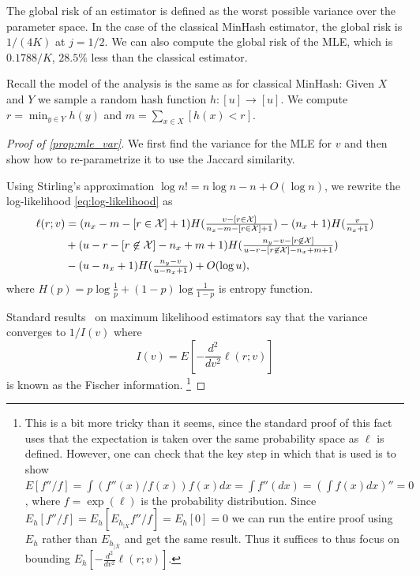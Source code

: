 The global risk of an estimator is defined as the worst possible variance over the parameter space.
In the case of the classical MinHash estimator, the global risk is $1/(4K)$ at $j=1/2$.
We can also compute the global risk of the MLE, which is $0.1788/K$, $28.5\%$ less than the classical estimator.

\smallskip

Recall the model of the analysis is the same as for classical MinHash:
Given $X$ and $Y$ we sample a random hash function $h:[u]\to[u]$.
We compute $r=\min_{y\in Y}h(y)$ and $m=\sum_{x\in X}[h(x)<r]$.

\begin{proof}[Proof of \cref{prop:mle_var}]
   We first find the variance for the MLE for $v$ and then show how to re-parametrize it to use the Jaccard similarity.

   Using Stirling's approximation $ \log n! = n\log n - n + O(\log n)$,
   we rewrite the log-likelihood \cref{eq:log-likelihood} as
   \begin{align}
      \ell(r;v) &=
      (n_x-m-[r\in\mathcal{X}]+1)H(\tfrac{v-[r\in\mathcal{X}]}{n_x-m-[r\in\mathcal{X}]+1})
               - (n_x+1) H(\tfrac{v}{n_x+1})
              \\&+(u-r-[r\not\in\mathcal{X}]-n_x+m+1) H(\tfrac{n_y-v-[r\not\in\mathcal{X}]}{u-r-[r\not\in\mathcal{X}]-n_x+m+1})
              \\& -(u-n_x+1) H(\tfrac{n_y-v}{u-n_x+1})
   + O(\log u),
   \end{align}
   where $H(p)=p \log \frac{1}{p} + (1-p)\log \frac{1}{1-p}$ is entropy function.

   Standard results~\cite{panchenko2016lec3} on maximum likelihood estimators say that
   the variance converges to $1/I(v)$ where
   \[
      I(v) = E\left[-\frac{d^2}{dv^2}\ell(r; v)\right]
   \]
   is known as the Fischer information.
   \footnote{This is a bit more tricky than it seems, since
      the standard proof of this fact~\cite{panchenko2016lec3} uses that the expectation is taken over the same probability space as $\ell$ is defined.
      However, one can check that the key step in which that is used is to show
      $E[f''/f] = \int (f''(x)/f(x))f(x)dx = \int f''(dx) = (\int f(x)dx)'' = 0$, where $f=\exp(\ell)$ is the probability distribution.
      Since $E_h[f''/f] = E_h[E_{h_{|\overline X}}f''/f] = E_h[0]= 0$
      we can run the entire proof using $E_h$ rather than $E_{h_{|\overline X}}$ and get the same result.
      Thus it suffices to thus focus on bounding $E_h[-\frac{d^2}{dv^2}\ell(r;v)]$.
   }


\end{proof}
